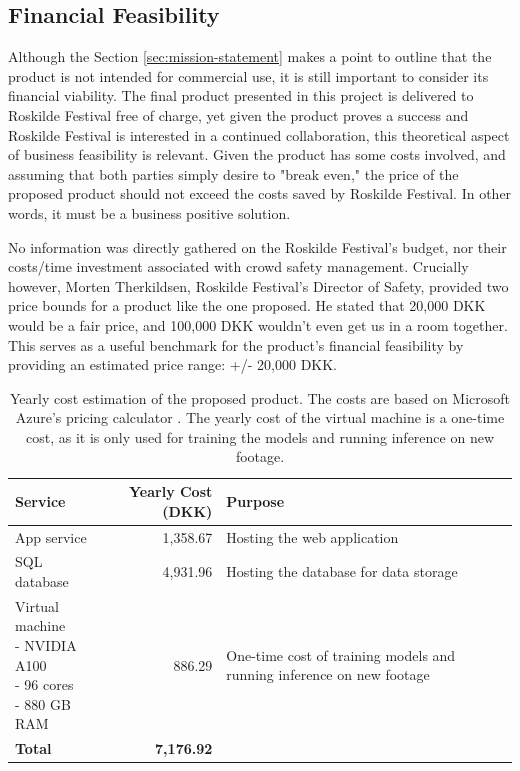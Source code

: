 \subsection{Financial Feasibility}

Although the Section \ref{sec:mission-statement} makes a point to outline that the product is not intended for commercial use, it is still important to consider its financial viability. The final product presented in this project is delivered to Roskilde Festival free of charge, yet given the product proves a success and Roskilde Festival is interested in a continued collaboration, this theoretical aspect of business feasibility is relevant. Given the product has some costs involved, and assuming that both parties simply desire to "break even," the price of the proposed product should not exceed the costs saved by Roskilde Festival. In other words, it must be a business positive solution.

No information was directly gathered on the Roskilde Festival's budget, nor their costs/time investment associated with crowd safety management. Crucially however, Morten Therkildsen, Roskilde Festival's Director of Safety, provided two price bounds for a product like the one proposed. He stated that 20,000 DKK would be a fair price, and 100,000 DKK wouldn't even get us in a room together. This serves as a useful benchmark for the product's financial feasibility by providing an estimated price range: +/- 20,000 DKK.

\begin{table}
  \centering
  \renewcommand{\arraystretch}{1.2}
  \begin{tabularx}{0.9\textwidth}{@{} l r X @{}}
    \toprule
    Service        & Yearly Cost (DKK) & Purpose                               \\
    \midrule
    App service    & 1,358.67          & Hosting the web application           \\
    SQL database   & 4,931.96          & Hosting the database for data storage \\
    \makecell[l]{Virtual machine                                               \\ {\scriptsize - NVIDIA A100} \\ {\scriptsize - 96 cores} \\ {\scriptsize - 880 GB RAM}} & 886.29 & One-time cost of training models and running inference on new footage \\
    \midrule
    \textbf{Total} & \textbf{7,176.92} &                                       \\
    \bottomrule
  \end{tabularx}
  \caption{Yearly cost estimation of the proposed product. The costs are based on Microsoft Azure's pricing calculator \cite{azure_pricing}. The yearly cost of the virtual machine is a one-time cost, as it is only used for training the models and running inference on new footage.}
  \label{tab:costs_estimation}
  \renewcommand{\arraystretch}{1.0}
\end{table}

